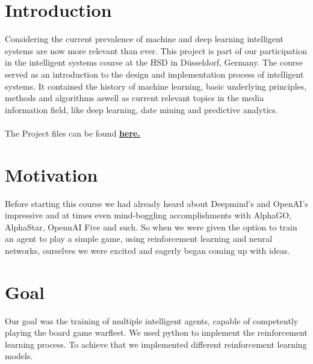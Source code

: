\documentclass[sigconf]{acmart}
\begin{document}

\maketitle 

\section{Introduction}
Considering the current prevalence of machine and deep learning intelligent systems are now more relevant than ever.
This project is part of our participation in the intelligent systems course at the HSD in Düsseldorf, Germany. The course served as an introduction to the design and implementation process of intelligent systems. It contained the history of machine learning, basic underlying principles, methods and algorithms aswell as current relevant topics in the media information field, like deep learning, date mining and predictive analytics. \\
\\
The Project files can be found \href{https://github.com/mickey175/Trained_Warfleet}{\textbf{\underline{here.}}} 

\section{Motivation}
Before starting this course we had already heard  about Deepmind's and OpenAI's impressive and at times even mind-boggling accomplishments with AlphaGO, AlphaStar, OpennAI Five and such. So when we were given the option to train an agent to play a simple game, using reinforcement learning and neural networks, ourselves we were excited and eagerly began coming up with ideas.

\section{Goal}
Our goal was the training of multiple intelligent agents, capable of competently playing the board game warfleet. 
We used python to implement the reinforcement learning process. 
To achieve that we implemented different reinforcement learning models. 
\end{document}
